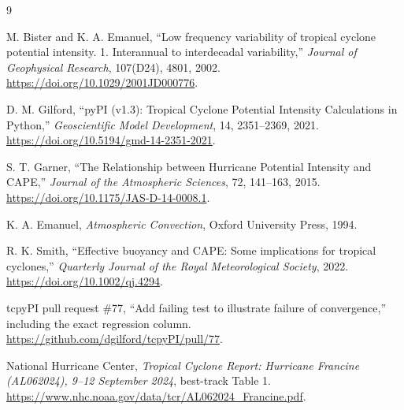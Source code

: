 \documentclass[11pt,a4paper]{article}
\theoremstyle{definition}
\begin{document}
\begin{thebibliography}{9}

M. Bister and K. A. Emanuel,
``Low frequency variability of tropical cyclone potential intensity. 1.
Interannual to interdecadal variability,''
\emph{Journal of Geophysical Research}, 107(D24), 4801, 2002.
\url{https://doi.org/10.1029/2001JD000776}.

D. M. Gilford,
``pyPI (v1.3): Tropical Cyclone Potential Intensity Calculations in Python,''
\emph{Geoscientific Model Development}, 14, 2351--2369, 2021.
\url{https://doi.org/10.5194/gmd-14-2351-2021}.

S. T. Garner,
``The Relationship between Hurricane Potential Intensity and CAPE,''
\emph{Journal of the Atmospheric Sciences}, 72, 141--163, 2015.
\url{https://doi.org/10.1175/JAS-D-14-0008.1}.

K. A. Emanuel, \emph{Atmospheric Convection}, Oxford University Press, 1994.

R. K. Smith,
``Effective buoyancy and CAPE: Some implications for tropical cyclones,''
\emph{Quarterly Journal of the Royal Meteorological Society}, 2022.
\url{https://doi.org/10.1002/qj.4294}.

tcpyPI pull request \#77, ``Add failing test to illustrate failure of
convergence,'' including the exact regression column.
\url{https://github.com/dgilford/tcpyPI/pull/77}.

National Hurricane Center,
\emph{Tropical Cyclone Report: Hurricane Francine (AL062024), 9--12
September 2024}, best-track Table 1.
\url{https://www.nhc.noaa.gov/data/tcr/AL062024_Francine.pdf}.

\end{thebibliography}
\end{document}
